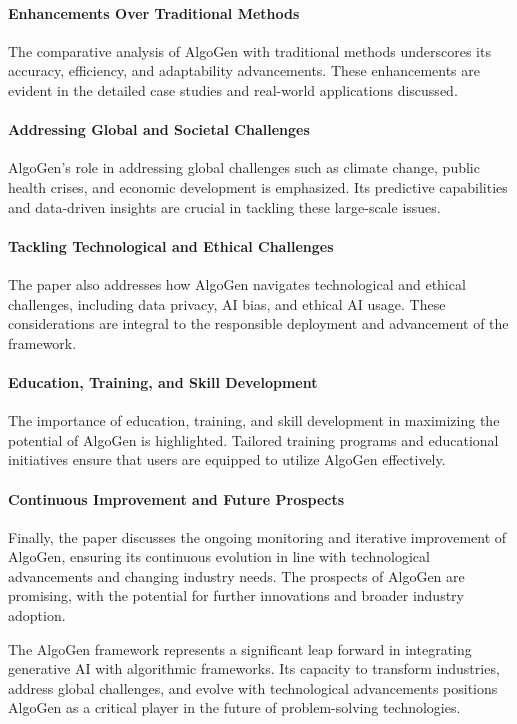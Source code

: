 \documentclass{article}
\begin{document}
\paragraph{Enhancements Over Traditional Methods}
The comparative analysis of AlgoGen with traditional methods underscores its accuracy, efficiency, and adaptability advancements. These enhancements are evident in the detailed case studies and real-world applications discussed.

\paragraph{Addressing Global and Societal Challenges}
AlgoGen's role in addressing global challenges such as climate change, public health crises, and economic development is emphasized. Its predictive capabilities and data-driven insights are crucial in tackling these large-scale issues.

\paragraph{Tackling Technological and Ethical Challenges}
The paper also addresses how AlgoGen navigates technological and ethical challenges, including data privacy, AI bias, and ethical AI usage. These considerations are integral to the responsible deployment and advancement of the framework.

\paragraph{Education, Training, and Skill Development}
The importance of education, training, and skill development in maximizing the potential of AlgoGen is highlighted. Tailored training programs and educational initiatives ensure that users are equipped to utilize AlgoGen effectively.

\paragraph{Continuous Improvement and Future Prospects}
Finally, the paper discusses the ongoing monitoring and iterative improvement of AlgoGen, ensuring its continuous evolution in line with technological advancements and changing industry needs. The prospects of AlgoGen are promising, with the potential for further innovations and broader industry adoption.

The AlgoGen framework represents a significant leap forward in integrating generative AI with algorithmic frameworks. Its capacity to transform industries, address global challenges, and evolve with technological advancements positions AlgoGen as a critical player in the future of problem-solving technologies.
\end{document}

